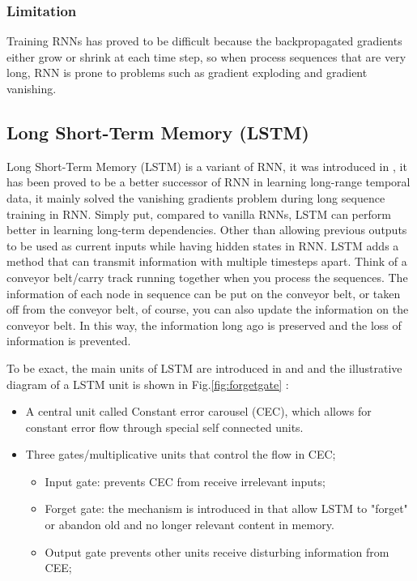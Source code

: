 \documentclass{article}
\begin{document}
\subsubsection{Limitation} 
Training RNNs has proved to be difficult because the backpropagated gradients
either grow or shrink at each time step, so when process sequences
that are very long, RNN is prone to problems such as gradient exploding and
gradient vanishing\cite{3-deeplearning}. 

\subsection{Long Short-Term Memory (LSTM) }

Long Short-Term Memory (LSTM) is a variant of RNN, it was introduced in
\cite{4-lstm}, it has been proved to be a better successor of RNN in learning
long-range temporal data, it
mainly solved the vanishing gradients problem during long sequence training in
RNN.
Simply put, compared to vanilla RNNs, LSTM can perform better in learning
long-term dependencies. Other than allowing previous outputs to be used as
current
inputs while having hidden
states in RNN. LSTM adds a method that can transmit information with multiple
timesteps apart. Think of a conveyor belt/carry track running together when you
process the sequences. The information of each node in sequence can be put on
the conveyor belt, or taken off from the conveyor belt, of course, you can also
update the information on the conveyor belt. In this way, the information long
ago is preserved and the loss of information is prevented.

To be exact, the main units of LSTM are introduced in \cite{4-lstm} and
\cite{5-forgetgate} and the illustrative diagram of a LSTM unit is shown in
Fig.\ref{fig:forgetgate} :
\begin{itemize}
	\setlength{\itemsep}{1pt}
	\setlength{\parskip}{0pt}
	\setlength{\parsep}{0pt}
  \item A central unit called Constant error carousel (CEC), which allows for
constant error flow
through special self connected units.
  \item Three gates/multiplicative units that control the flow in CEC;
  \begin{itemize}
 		\item Input gate: prevents CEC from receive irrelevant inputs; 
		\item Forget gate: the mechanism is introduced in \cite{5-forgetgate} that
allow LSTM to "forget" or abandon old and no longer relevant content in
memory.
 		\item Output gate prevents other units receive disturbing information from
CEE;
	\end{itemize}
\end{itemize}
\end{document}

